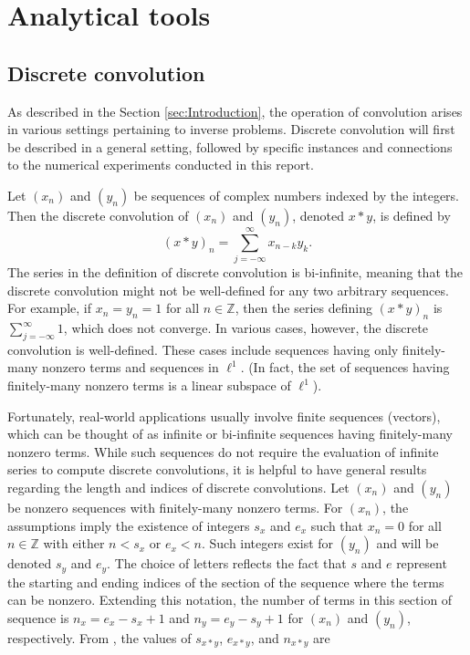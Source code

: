 \documentclass[12pt]{article}
\begin{document}
\section{Analytical tools} \label{sec:Analytical tools}

\subsection{Discrete convolution} \label{sec:Discrete convolution}
As described in the Section \ref{sec:Introduction}, the operation of convolution arises in various settings pertaining to inverse problems. Discrete convolution will first be described  in a general setting, followed by specific instances and connections to the numerical experiments conducted in this report. \par
Let $(x_n)$ and $(y_n)$ be sequences of complex numbers indexed by the integers. Then the discrete convolution of $(x_n)$ and $(y_n)$, denoted $x*y$, is defined by
\[(x*y)_n = \sum_{j=-\infty}^\infty x_{n-k}y_k.\]
The series in the definition of discrete convolution is bi-infinite, meaning that the discrete convolution might not be well-defined for any two arbitrary sequences. For example, if $x_n = y_n = 1$ for all $n \in \mathbb{Z}$, then the series defining $(x*y)_n$ is $\sum_{j=-\infty}^\infty 1$, which does not converge. In various cases, however, the discrete convolution is well-defined. These cases include sequences having only finitely-many nonzero terms and sequences in $\ell^1$. (In fact, the set of sequences having finitely-many nonzero terms is a linear subspace of $\ell^1$).  \par 
Fortunately, real-world applications usually involve finite sequences (vectors), which can be thought of as infinite or bi-infinite sequences having finitely-many nonzero terms. While such sequences do not require the evaluation of infinite series to compute discrete convolutions, it is helpful to have general results regarding the length and indices of discrete convolutions. Let $(x_n)$ and $(y_n)$ be nonzero sequences with finitely-many nonzero terms. For $(x_n)$, the assumptions imply the existence of integers $s_x$ and $e_x$ such that $x_n = 0$ for all $n \in \mathbb{Z}$ with either $n < s_x$ or $e_x < n$. Such integers exist for $(y_n)$ and will be denoted $s_y$ and $e_y$. The choice of letters reflects the fact that $s$ and $e$ represent the starting and ending indices of the section of the sequence where the terms can be nonzero. Extending this notation, the number of terms in this section of sequence is $n_x = e_x - s_x + 1$ and $n_y = e_y - s_y + 1$ for $(x_n)$ and $(y_n)$, respectively. From \cite{BoggessAlbert2001Afci}, the values of $s_{x*y}$, $e_{x*y}$, and $n_{x*y}$ are
\end{document}
